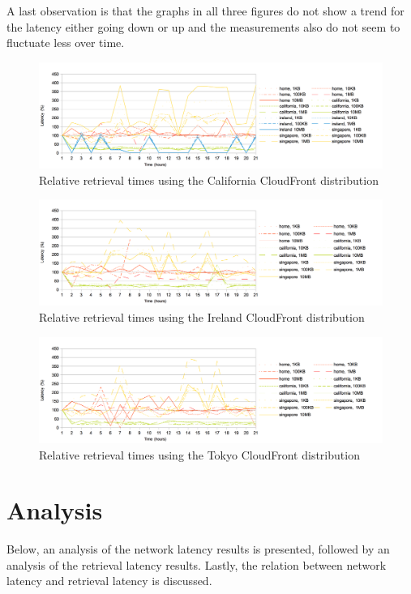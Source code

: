 \documentclass[conference]{IEEEtran}
\begin{document}
A last observation is that the graphs in all three figures do not show a trend for the latency either going down or up and the measurements also do not seem to fluctuate less over time.


\begin{figure}[]
    \centering
    \includegraphics[width=\linewidth]{images/california_relative.png}
    \caption[]{Relative retrieval times using the California CloudFront distribution}
    \label{fig:california_relative}
\end{figure}

\begin{figure}[]
    \centering
    \includegraphics[width=\linewidth]{images/ireland_relative.png}
    \caption[]{Relative retrieval times using the Ireland CloudFront distribution}
    \label{fig:ireland_relative}
\end{figure}

\begin{figure}[]
    \centering
    \includegraphics[width=\linewidth]{images/tokyo_relative.png}
    \caption[]{Relative retrieval times using the Tokyo CloudFront distribution}
    \label{fig:tokyo_relative}
\end{figure}


\section{Analysis}
Below, an analysis of the network latency results is presented, followed by an analysis of the retrieval latency results. Lastly, the relation between network latency and retrieval latency is discussed.
\end{document}
